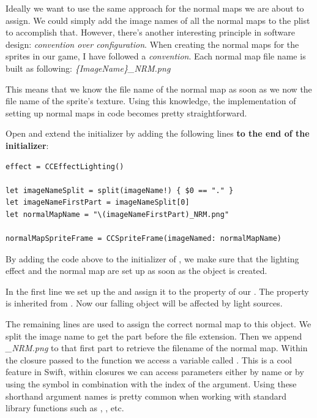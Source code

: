 Ideally we want to use the same approach for the normal maps we are about to
assign. We could simply add the image names of all the normal maps to the plist
to accomplish that. However, there's another interesting principle in software
design: \textit{convention over configuration}. When creating the normal maps
for the sprites in our game, I have followed a \textit{convention}. Each normal
map file name is built as following: \textit{\{ImageName\}\_NRM.png}

This means that we know the file name of the normal map as soon as we now the
file name of the sprite's texture. Using this knowledge, the implementation of
setting up normal maps in code becomes pretty straightforward.

\begin{leftbar}
Open  and extend the 
initializer by adding the following lines \textbf{to the end of the
initializer}:
\begin{lstlisting}
effect = CCEffectLighting()
    
let imageNameSplit = split(imageName!) { $0 == "." }
let imageNameFirstPart = imageNameSplit[0]
let normalMapName = "\(imageNameFirstPart)_NRM.png"

normalMapSpriteFrame = CCSpriteFrame(imageNamed: normalMapName)
\end{lstlisting}
\end{leftbar}

By adding the code above to the initializer of , we
make sure that the lighting effect and the normal map are set up as soon as the
object is created.

In the first line we set up the  and assign it to
the  property of our . The
 property is inherited from . Now our
falling object will be affected by light sources.

The remaining lines are used to assign the correct normal map to this object. We
split the image name to get the part before the file extension. Then we append
\textit{\_NRM.png} to that first part to retrieve the filename of the normal
map. Within the closure passed to the  function we access a
variable called . This is a cool feature in Swift, within
closures we can access parameters either by name or by using the \inlinecode{\$}
symbol in combination with the index of the argument. Using these shorthand
argument names is pretty common when working with standard library functions
such as , , etc.

